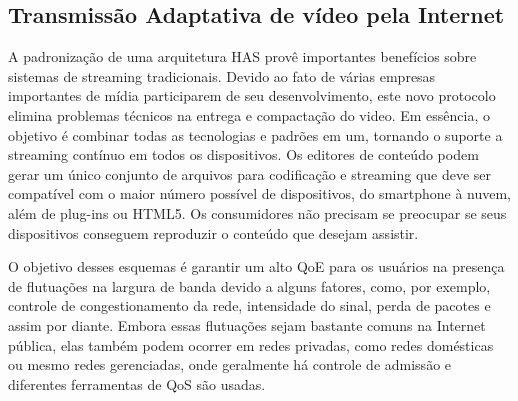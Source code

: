 \subsection{Transmissão Adaptativa de vídeo pela Internet}
\label{sec:has-dash}

A padronização de uma arquitetura HAS provê importantes benefícios sobre sistemas de streaming tradicionais. Devido ao fato de várias empresas importantes de mídia participarem de seu desenvolvimento, este novo protocolo elimina problemas técnicos na entrega e compactação do video. Em essência, o objetivo é combinar todas as tecnologias e padrões em um, tornando o suporte a streaming contínuo em todos os dispositivos. 
Os editores de conteúdo podem gerar um único conjunto de arquivos para codificação e streaming que deve ser compatível com o maior número possível de dispositivos, do smartphone à nuvem, além de plug-ins ou HTML5. Os consumidores não precisam se preocupar se seus dispositivos conseguem reproduzir o conteúdo que desejam assistir.

O objetivo desses esquemas é garantir um alto QoE para os usuários na presença de flutuações na largura de banda devido a alguns fatores, como, por exemplo, controle de congestionamento da rede, intensidade do sinal, perda de pacotes e assim por diante. Embora essas flutuações sejam bastante comuns na Internet pública, elas também podem ocorrer em redes privadas, como redes domésticas ou mesmo redes gerenciadas, onde geralmente há controle de admissão e diferentes ferramentas de QoS são usadas.

